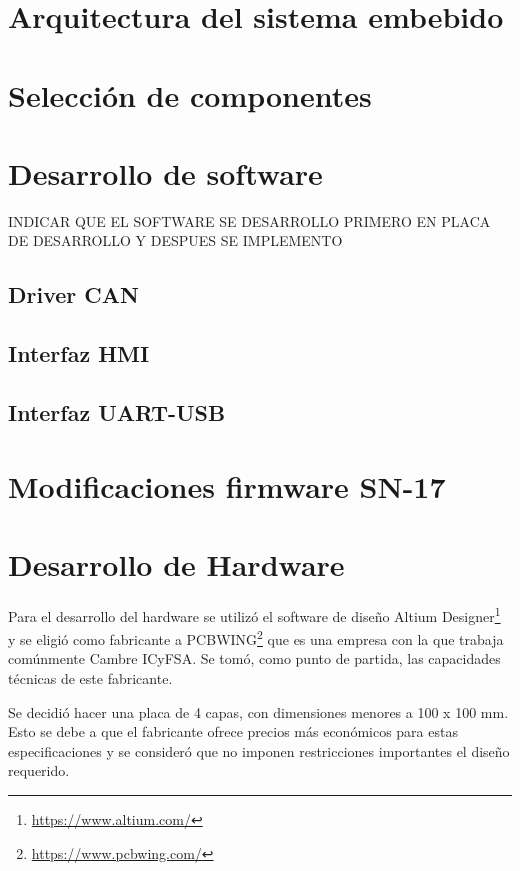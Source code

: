 \section{Arquitectura del sistema embebido}
 
\section{Selección de componentes}

\section{Desarrollo de software}

INDICAR QUE EL SOFTWARE SE DESARROLLO PRIMERO EN PLACA DE DESARROLLO Y DESPUES SE IMPLEMENTO

\subsection{Driver CAN}

\subsection{Interfaz HMI}

\subsection{Interfaz UART-USB}

\section{Modificaciones firmware SN-17}

\section{Desarrollo de Hardware}

Para el desarrollo del hardware se utilizó el software de diseño Altium Designer\footnote{\url{https://www.altium.com/}} y se eligió como fabricante a PCBWING\footnote{\url{https://www.pcbwing.com/}} que es una empresa con la que trabaja comúnmente Cambre ICyFSA. Se tomó, como punto de partida, las capacidades técnicas de este fabricante.

Se decidió hacer una placa de 4 capas, con dimensiones menores a 100 x 100 mm. Esto se debe a que el fabricante ofrece precios más económicos para estas especificaciones y se consideró que no imponen restricciones importantes el diseño requerido.

